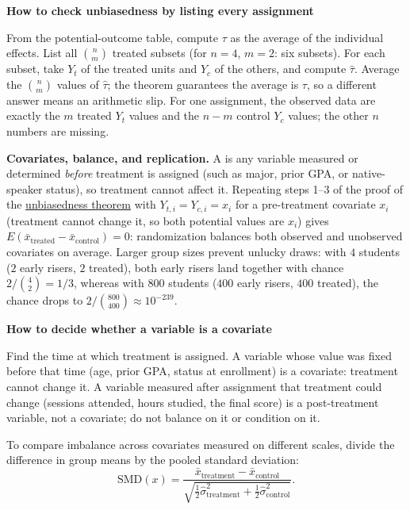 \documentclass[10pt]{scrartcl}
\newenvironment{howto}[1]{\begin{mdframed}[style=howtostyle]{\color{NavyBlue}\textbf{#1}}\par\vspace{2pt}}{\end{mdframed}}
\begin{document}
\begin{howto}{How to check unbiasedness by listing every assignment}
\begin{steps}
  \ii From the potential-outcome table, compute $\tau$ as the average of the individual effects.
  \ii List all $\binom{n}{m}$ treated subsets (for $n=4$, $m=2$: six subsets).
  \ii For each subset, take $Y_t$ of the treated units and $Y_c$ of the others, and compute $\hat\tau$.
  \ii Average the $\binom nm$ values of $\hat\tau$; the theorem guarantees the average is $\tau$, so a different answer means an arithmetic slip.
  \ii For one assignment, the observed data are exactly the $m$ treated $Y_t$ values and the $n-m$ control $Y_c$ values; the other $n$ numbers are missing.
\end{steps}
\end{howto}

\medskip\noindent\textbf{Covariates, balance, and replication.} A  is any variable measured or determined \emph{before} treatment is assigned (such as major, prior GPA, or native-speaker status), so treatment cannot affect it. Repeating steps 1--3 of the proof of the \hyperref[thm-unbiased-rct]{unbiasedness theorem} with $Y_{t,i} = Y_{c,i} = x_i$ for a pre-treatment covariate $x_i$ (treatment cannot change it, so both potential values are $x_i$) gives $E(\bar x_{\text{treated}} - \bar x_{\text{control}}) = 0$: randomization balances both observed and unobserved covariates on average. Larger group sizes prevent unlucky draws: with $4$ students ($2$ early risers, $2$ treated), both early risers land together with chance $2/\binom{4}{2} = 1/3$, whereas with $800$ students ($400$ early risers, $400$ treated), the chance drops to $2/\binom{800}{400} \approx 10^{-239}$.

\begin{howto}{How to decide whether a variable is a covariate}
\begin{steps}
  \ii Find the time at which treatment is assigned.
  \ii A variable whose value was fixed before that time (age, prior GPA, status at enrollment) is a covariate: treatment cannot change it.
  \ii A variable measured after assignment that treatment could change (sessions attended, hours studied, the final score) is a post-treatment variable, not a covariate; do not balance on it or condition on it.
\end{steps}
\end{howto}

\begin{definition*}
  To compare imbalance across covariates measured on different scales, divide the difference in group means by the pooled standard deviation:
  \[
    \mathrm{SMD}(x) = \frac{\bar x_{\text{treatment}} - \bar x_{\text{control}}}{\sqrt{\tfrac{1}{2}\hat\sigma^2_{\text{treatment}} + \tfrac{1}{2}\hat\sigma^2_{\text{control}}}}.
  \]
\end{definition*}
\end{document}
